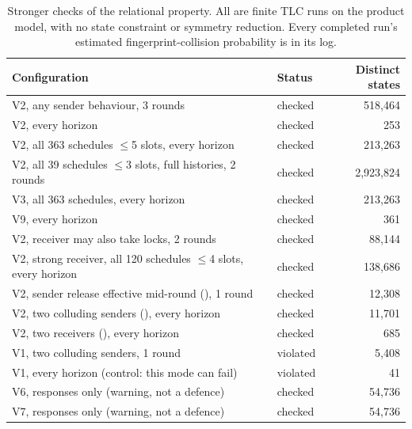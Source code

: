 \begin{table}[!ht]
\centering\footnotesize
\caption{Stronger checks of the relational property. All are finite TLC runs on the product model, with no state constraint or symmetry reduction. Every completed run's estimated fingerprint-collision probability is in its log.}
\label{tab:strength}
\begin{tabularx}{\textwidth}{@{}Y l r@{}}
\toprule
\textbf{Configuration} & \textbf{Status} & \textbf{Distinct states}\\
\midrule
V2, any sender behaviour, 3 rounds & checked & 518{,}464 \\
V2, every horizon & checked & 253 \\
V2, all 363 schedules $\leq$5 slots, every horizon & checked & 213{,}263 \\
V2, all 39 schedules $\leq$3 slots, full histories, 2 rounds & checked & 2{,}923{,}824 \\
V3, all 363 schedules, every horizon & checked & 213{,}263 \\
V9, every horizon & checked & 361 \\
V2, receiver may also take locks, 2 rounds & checked & 88{,}144 \\
V2, strong receiver, all 120 schedules $\leq$4 slots, every horizon & checked & 138{,}686 \\
V2, sender release effective mid-round (), 1 round & checked & 12{,}308 \\
V2, two colluding senders (), every horizon & checked & 11{,}701 \\
V2, two receivers (), every horizon & checked & 685 \\
V1, two colluding senders, 1 round & violated & 5{,}408 \\
V1, every horizon (control: this mode can fail) & violated & 41 \\
V6, responses only (warning, not a defence) & checked & 54{,}736 \\
V7, responses only (warning, not a defence) & checked & 54{,}736 \\
\bottomrule
\end{tabularx}
\end{table}
